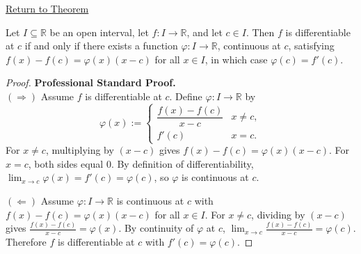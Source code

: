 \newpage
{}
\label{prf:caratheodory-theorem}

\begin{remark*}[Return]
\hyperref[thm:caratheodory]{Return to Theorem}
\end{remark*}

\begin{theorem*}
Let $I \subseteq \mathbb{R}$ be an open interval, let $f : I \to \mathbb{R}$, and let $c \in I$. Then $f$ is differentiable at $c$ if and only if there exists a function $\varphi : I \to \mathbb{R}$, continuous at $c$, satisfying $f(x) - f(c) = \varphi(x)(x - c)$ for all $x \in I$, in which case $\varphi(c) = f'(c)$.
\end{theorem*}

\begin{proof}
\textbf{Professional Standard Proof.}~\\
$(\Rightarrow)$ Assume $f$ is differentiable at $c$. Define $\varphi : I \to \mathbb{R}$ by
\[
  \varphi(x) :=
  \begin{cases}
    \dfrac{f(x) - f(c)}{x - c} & x \neq c, \\[6pt]
    f'(c)                       & x = c.
  \end{cases}
\]
For $x \neq c$, multiplying by $(x-c)$ gives $f(x) - f(c) = \varphi(x)(x-c)$. For $x = c$, both sides equal $0$. By definition of differentiability, $\lim_{x \to c} \varphi(x) = f'(c) = \varphi(c)$, so $\varphi$ is continuous at $c$.

$(\Leftarrow)$ Assume $\varphi : I \to \mathbb{R}$ is continuous at $c$ with $f(x) - f(c) = \varphi(x)(x-c)$ for all $x \in I$. For $x \neq c$, dividing by $(x-c)$ gives $\frac{f(x) - f(c)}{x - c} = \varphi(x)$. By continuity of $\varphi$ at $c$, $\lim_{x \to c} \frac{f(x) - f(c)}{x - c} = \varphi(c)$. Therefore $f$ is differentiable at $c$ with $f'(c) = \varphi(c)$.
\end{proof}

